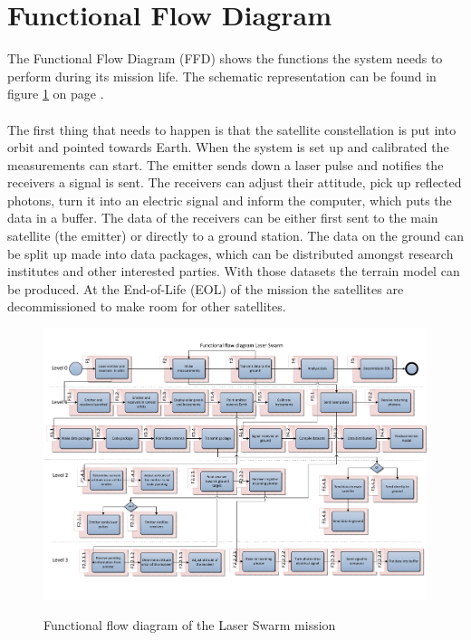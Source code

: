 
\section{Functional Flow Diagram}
The Functional Flow Diagram (FFD) shows the functions the system needs to perform during its mission life. The schematic representation can be found in figure \ref{pic_FFD} on page \pageref{pic_FFD}.
\\ \\
The first thing that needs to happen is that the satellite constellation is put into orbit and pointed towards Earth. When the system is set up and calibrated the measurements can start. The emitter sends down a laser pulse and notifies the receivers a signal is sent. The receivers can adjust their attitude, pick up reflected photons, turn it into an electric signal and inform the computer, which puts the data in a buffer. The data of the receivers can be either first sent to the main satellite (the emitter) or directly to a ground station. The data on the ground can be split up made into data packages, which can be distributed amongst research institutes and other interested parties. With those datasets the terrain model can be produced. At the End-of-Life (EOL) of the mission the satellites are decommissioned to make room for other satellites.

\begin{figure}
\includegraphics[scale=0.7, angle=90]{img/pic_FFD.pdf}
\label{pic_FFD}
\caption{Functional flow diagram of the Laser Swarm mission}
\end{figure}


